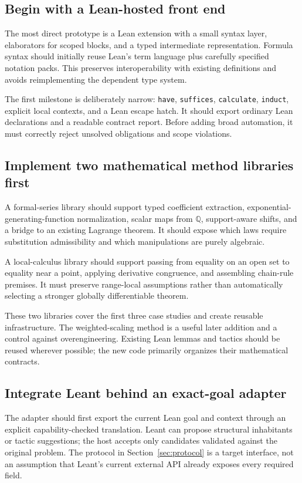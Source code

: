 \documentclass[11pt,a4paper]{article}
\newcommand{\Q}{\mathbb Q}
\newcommand{\code}[1]{\texttt{#1}}
\theoremstyle{remark}
\begin{document}
\subsection{Begin with a Lean-hosted front end}

The most direct prototype is a Lean extension with a small syntax layer, elaborators for scoped blocks, and a typed intermediate representation. Formula syntax should initially reuse Lean's term language plus carefully specified notation packs. This preserves interoperability with existing definitions and avoids reimplementing the dependent type system.

The first milestone is deliberately narrow: \code{have}, \code{suffices}, \code{calculate}, \code{induct}, explicit local contexts, and a Lean escape hatch. It should export ordinary Lean declarations and a readable contract report. Before adding broad automation, it must correctly reject unsolved obligations and scope violations.

\subsection{Implement two mathematical method libraries first}

A formal-series library should support typed coefficient extraction, exponential-generating-function normalization, scalar maps from $\Q$, support-aware shifts, and a bridge to an existing Lagrange theorem. It should expose which laws require substitution admissibility and which manipulations are purely algebraic.

A local-calculus library should support passing from equality on an open set to equality near a point, applying derivative congruence, and assembling chain-rule premises. It must preserve range-local assumptions rather than automatically selecting a stronger globally differentiable theorem.

These two libraries cover the first three case studies and create reusable infrastructure. The weighted-scaling method is a useful later addition and a control against overengineering. Existing Lean lemmas and tactics should be reused wherever possible; the new code primarily organizes their mathematical contracts.

\subsection{Integrate Leant behind an exact-goal adapter}

The adapter should first export the current Lean goal and context through an explicit capability-checked translation. Leant can propose structural inhabitants or tactic suggestions; the host accepts only candidates validated against the original problem. The protocol in Section~\ref{sec:protocol} is a target interface, not an assumption that Leant's current external API already exposes every required field.
\end{document}
